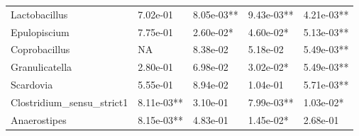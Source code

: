 \begin{table}[!h]
\begin{tabular}[t]{lllll}
Lactobacillus & 7.02e-01 & 8.05e-03** & 9.43e-03** & 4.21e-03**\\
Epulopiscium & 7.75e-01 & 2.60e-02* & 4.60e-02* & 5.13e-03**\\
\addlinespace
Coprobacillus & NA & 8.38e-02 & 5.18e-02 & 5.49e-03**\\
Granulicatella & 2.80e-01 & 6.98e-02 & 3.02e-02* & 5.49e-03**\\
Scardovia & 5.55e-01 & 8.94e-02 & 1.04e-01 & 5.71e-03**\\
Clostridium_sensu_strict1 & 8.11e-03** & 3.10e-01 & 7.99e-03** & 1.03e-02*\\
Anaerostipes & 8.15e-03** & 4.83e-01 & 1.45e-02* & 2.68e-01\\
\bottomrule
\end{tabular}
\end{table}
